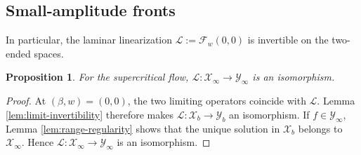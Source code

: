 \documentclass[12pt,letterpaper]{amsart}
\newtheorem{prop}[theorem]{Proposition}
\numberwithin{equation}{section}
\begin{document}
	\subsection{{Small-amplitude fronts}}
	{In particular, the laminar linearization $\mathcal L:=\mathcal F_w(0,0)$ is invertible on the two-ended spaces.}
	\begin{prop}\label{prop:f0inverse}
		For the supercritical flow,
		$\mathcal{L}:\mathscr{X}_\infty\to\mathscr{Y}_\infty$
		is an isomorphism.
	\end{prop}
	{
	\begin{proof}
	At $(\beta,w)=(0,0)$, the two limiting operators coincide with $\mathcal L$. Lemma \ref{lem:limit-invertibility} therefore makes $\mathcal L:\mathscr X_b\to\mathscr Y_b$ an isomorphism. If $f\in\mathscr Y_\infty$, Lemma \ref{lem:range-regularity} shows that the unique solution in $\mathscr X_b$ belongs to $\mathscr X_\infty$. Hence $\mathcal L:\mathscr X_\infty\to\mathscr Y_\infty$ is an isomorphism.
	\end{proof}}
	
\end{document}
